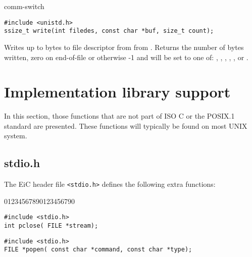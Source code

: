 \begin{Ventry2}{comm-switch  }
\item[write]
\label{item:write}
\begin{production}
\begin{verbatim}
#include <unistd.h>
ssize_t write(int filedes, const char *buf, size_t count);
\end{verbatim}
\end{production}
       
Writes up to  bytes to file descriptor  from from
. Returns the number of bytes written, zero on end-of-file or
otherwise -1 and  will be set to one of: , , 
, , ,  or . 


\end{Ventry2}


\section{Implementation library support}
\label{sec:ImplementationLibrary}

In this section, those functions that are not part of ISO C or the POSIX.1
standard are presented. These functions will typically be found
on most UNIX system.



\subsection{stdio.h}
\label{sec:stdiohImplementation}

The EiC header file \verb+<stdio.h>+ defines the following 
extra functions:

\begin{Ventry2}{01234567890123456790}


\item[pclose]
\label{item:pclose}
\begin{production}
\begin{verbatim}
#include <stdio.h>
int pclose( FILE *stream);
\end{verbatim}
\end{production}

\item[popen]
\label{item:popen}
\begin{production}
\begin{verbatim}
#include <stdio.h>
FILE *popen( const char *command, const char *type);
\end{verbatim}
\end{production}

\end{Ventry2}

